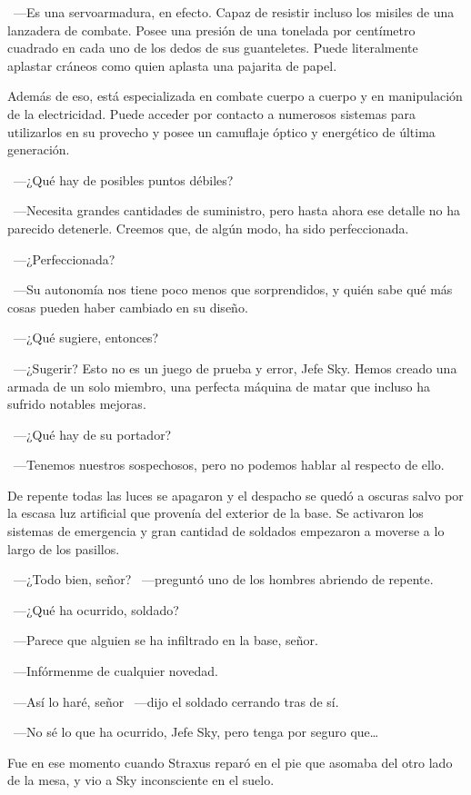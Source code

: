 ~---Es una servoarmadura, en efecto. Capaz de resistir incluso los misiles de una lanzadera de combate. Posee una presión de una tonelada por centímetro cuadrado en cada uno de los dedos de sus guanteletes. Puede literalmente aplastar cráneos como quien aplasta una pajarita de papel.

\rquoti Además de eso, está especializada en combate cuerpo a cuerpo y en manipulación de la electricidad. Puede acceder por contacto a numerosos sistemas para utilizarlos en su provecho y posee un camuflaje óptico y energético de última generación.

~---¿Qué hay de posibles puntos débiles?

~---Necesita grandes cantidades de suministro, pero hasta ahora ese detalle no ha parecido detenerle. Creemos que, de algún modo, ha sido perfeccionada.

~---¿Perfeccionada?

~---Su autonomía nos tiene poco menos que sorprendidos, y quién sabe qué más cosas pueden haber cambiado en su diseño.

~---¿Qué sugiere, entonces?

~---¿Sugerir? Esto no es un juego de prueba y error, Jefe Sky. Hemos creado una armada de un solo miembro, una perfecta máquina de matar que incluso ha sufrido notables mejoras.

~---¿Qué hay de su portador?

~---Tenemos nuestros sospechosos, pero no podemos hablar al respecto de ello.

De repente todas las luces se apagaron y el despacho se quedó a oscuras salvo por la escasa luz artificial que provenía del exterior de la base. Se activaron los sistemas de emergencia y gran cantidad de soldados empezaron a moverse a lo largo de los pasillos.

~---¿Todo bien, señor? ~---preguntó uno de los hombres abriendo de repente.

~---¿Qué ha ocurrido, soldado?

~---Parece que alguien se ha infiltrado en la base, señor.

~---Infórmenme de cualquier novedad.

~---Así lo haré, señor ~---dijo el soldado cerrando tras de sí.

~---No sé lo que ha ocurrido, Jefe Sky, pero tenga por seguro que\dots

Fue en ese momento cuando Straxus reparó en el pie que asomaba del otro lado de la mesa, y vio a Sky inconsciente en el suelo.

